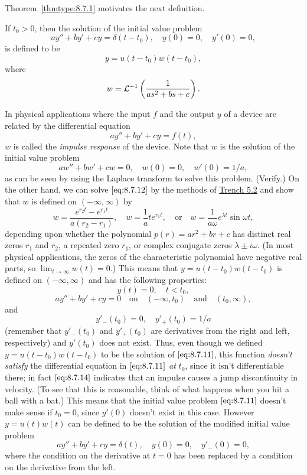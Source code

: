 \documentclass{ximera}
\begin{document}
Theorem~\ref{thmtype:8.7.1} motivates the next definition.

\begin{definition}\label{thmtype:8.7.2}
If $t_0>0$, then the solution of the initial value problem
\begin{equation} \label{eq:8.7.11}
ay''+by'+cy=\delta(t-t_0), \quad  y(0)=0,\quad y'(0)=0,
\end{equation}
is defined to be
$$
y=u(t-t_0)w(t-t_0),
$$
where
$$
w={\cal L}^{-1}\left(\frac{1}{as^2+bs+c}\right).
$$
\end{definition}

In physical applications where the input $f$ and the output $y$ of a
device are related by the differential equation
$$
ay''+by'+cy=f(t),
$$
$w$ is called the \textit{impulse response} of the device. Note
that $w$ is the solution of the initial value problem
\begin{equation} \label{eq:8.7.12}
aw''+bw'+cw=0, \quad  w(0)=0,\quad  w'(0)=1/a,
\end{equation}
as can be seen by using the Laplace transform to solve this problem.
(Verify.)
On the other hand, we can solve $\eqref{eq:8.7.12}$ by the methods of
\href{https://ximera.osu.edu/ode/main/constantCoefficientHomogeneousEquations/constantCoefficientHomogeneousEquations}{Trench 5.2} 
and show that $w$ is defined on
$(-\infty,\infty)$ by
\begin{equation} \label{eq:8.7.13}
w=\frac{e^{r_2t}-e^{r_1t}}{a(r_2-r_1)},\quad
w=\frac{1}{a}te^{r_1t}, \quad\mbox{or}\quad
w=\frac{1}{a\omega}e^{\lambda t}\sin\omega t,
\end{equation}
depending upon whether the polynomial $p(r)=ar^2+br+c$ has distinct
real zeros $r_1$ and $r_2$, a repeated zero $r_1$, or complex
conjugate zeros $\lambda\pm i\omega$. (In most physical applications,
the zeros of the characteristic polynomial have negative real parts,
so $\lim_{t\rightarrow\infty}w(t)=0$.) This means that $y=u(t-t_0)w(t-t_0)$ is
defined on $(-\infty,\infty)$ and has the following properties:
$$
y(t)=0,\quad  t<t_0,
$$
$$
ay''+by'+cy=0\quad\mbox{on}\quad  (-\infty,t_0)\quad\mbox{and}\quad(t_0,\infty),
$$
and
\begin{equation} \label{eq:8.7.14}
y'_-(t_0)=0, \quad   y'_+(t_0)=1/a
\end{equation}
(remember that $y'_-(t_0)$ and $y'_+(t_0)$ are derivatives from the
right and left, respectively) and $y'(t_0)$ does not exist. Thus, even
though we defined $y=u(t-t_0)w(t-t_0)$ to be the solution of
$\eqref{eq:8.7.11}$,  this function \textit{doesn't satisfy}
the differential equation in $\eqref{eq:8.7.11}$ \textit{at} $t_0$, since it
isn't differentiable there;   in fact $\eqref{eq:8.7.14}$ indicates that an
impulse causes a jump discontinuity in velocity. (To see that this is
reasonable, think of what happens when you hit a ball with a bat.)
This means that the initial value problem $\eqref{eq:8.7.11}$ doesn't make
sense if $t_0=0$, since $y'(0)$ doesn't exist in this case. However
$y=u(t)w(t)$ can be defined to be the solution of the modified initial
value problem
$$
ay''+by'+cy=\delta(t), \quad  y(0)=0,\quad y'_-(0)=0,
$$
where the condition on the derivative at $t=0$ has been replaced by a
condition on the derivative from the left.
\end{document}
